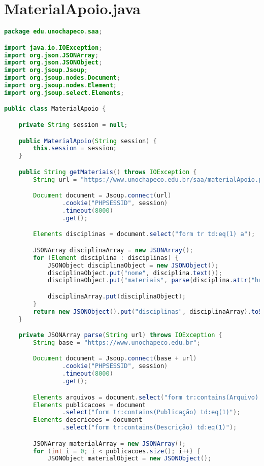 \section{MaterialApoio.java}
\begin{lstlisting}[language=java, frame=single]
package edu.unochapeco.saa;

import java.io.IOException;
import org.json.JSONArray;
import org.json.JSONObject;
import org.jsoup.Jsoup;
import org.jsoup.nodes.Document;
import org.jsoup.nodes.Element;
import org.jsoup.select.Elements;

public class MaterialApoio {

    private String session = null;

    public MaterialApoio(String session) {
        this.session = session;
    }

    public String getMateriais() throws IOException {
        String url = "https://www.unochapeco.edu.br/saa/materialApoio.php";

        Document document = Jsoup.connect(url)
                .cookie("PHPSESSID", session)
                .timeout(8000)
                .get();

        Elements disciplinas = document.select("form tr td:eq(1) a");

        JSONArray disciplinaArray = new JSONArray();
        for (Element disciplina : disciplinas) {
            JSONObject disciplinaObject = new JSONObject();
            disciplinaObject.put("nome", disciplina.text());
            disciplinaObject.put("materiais", parse(disciplina.attr("href")));

            disciplinaArray.put(disciplinaObject);
        }
        return new JSONObject().put("disciplinas", disciplinaArray).toString();
    }

    private JSONArray parse(String url) throws IOException {
        String base = "https://www.unochapeco.edu.br";

        Document document = Jsoup.connect(base + url)
                .cookie("PHPSESSID", session)
                .timeout(8000)
                .get();

        Elements arquivos = document.select("form tr:contains(Arquivo) a");
        Elements publicacoes = document
                .select("form tr:contains(Publicação) td:eq(1)");
        Elements descricoes = document
                .select("form tr:contains(Descrição) td:eq(1)");

        JSONArray materialArray = new JSONArray();
        for (int i = 0; i < publicacoes.size(); i++) {
            JSONObject materialObject = new JSONObject();


\end{lstlisting}
